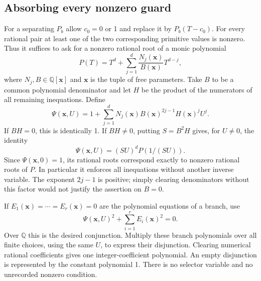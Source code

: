 \documentclass[11pt,reqno]{amsart}
\theoremstyle{definition}
\numberwithin{equation}{section}
\newcommand{\Q}{\mathbb Q}
\begin{document}
\subsection{Absorbing every nonzero guard}
For a separating $P_b$ allow $c_0=0$ or 1 and replace it by $P_b(T-c_0)$. For every rational pair at least one of the two corresponding primitive values is nonzero. Thus it suffices to ask for a nonzero rational root of a monic polynomial
\[
 P(T)=T^d+\sum_{j=1}^d\frac{N_j(\mathbf x)}{B(\mathbf x)}T^{d-j},
\]
where $N_j,B\in\Q[\mathbf x]$ and $\mathbf x$ is the tuple of free parameters. Take $B$ to be a common polynomial denominator and let $H$ be the product of the numerators of all remaining inequations. Define
\begin{equation}\label{eq:reciprocal}
 \Psi(\mathbf x,U)=1+\sum_{j=1}^d
 N_j(\mathbf x)B(\mathbf x)^{2j-1}H(\mathbf x)^jU^j.
\end{equation}
If $BH=0$, this is identically 1. If $BH\ne0$, putting $S=B^2H$ gives, for $U\ne0$, the identity
\[
 \Psi(\mathbf x,U)=(SU)^dP(1/(SU)).
\]
Since $\Psi(\mathbf x,0)=1$, its rational roots correspond exactly to nonzero rational roots of $P$. In particular it enforces all inequations without another inverse variable. The exponent $2j-1$ is positive; simply clearing denominators without this factor would not justify the assertion on $B=0$.

If $E_1(\mathbf x)=\cdots=E_r(\mathbf x)=0$ are the polynomial equations of a branch, use
\[
 \Psi(\mathbf x,U)^2+\sum_{i=1}^rE_i(\mathbf x)^2=0.
\]
Over $\Q$ this is the desired conjunction. Multiply these branch polynomials over all finite choices, using the same $U$, to express their disjunction. Clearing numerical rational coefficients gives one integer-coefficient polynomial. An empty disjunction is represented by the constant polynomial 1. There is no selector variable and no unrecorded nonzero condition.
\end{document}

